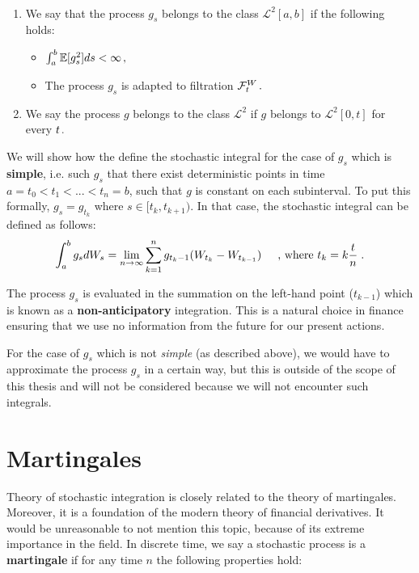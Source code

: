 \documentclass[times, utf8, diplomski]{fer}
\begin{document}
\begin{definition}~\\
\begin{enumerate}[label=(\roman*)]
	\item We say that the process $g_s$ belongs to the class $\mathcal{L}^2[a,b]$ if the following holds:
	\begin{itemize}
		\item $ \int_a^b\mathbb{E}[g_s^2]ds < \infty\hspace{0.05cm},$
		\item The process $g_s$ is adapted to filtration $\mathcal{F}_t^W\hspace{0.05cm}.$
	\end{itemize}
	\item We say the process $g$ belongs to the class $\mathcal{L}^2$ if $g$ belongs to $\mathcal{L}^2[0,t]$ for every $t\hspace{0.05cm}.$
\end{enumerate}
\end{definition}

\noindent We will show how the define the stochastic integral for the case of $g_s$ which is \textbf{simple}, i.e. such $g_s$ that there exist deterministic points in time $a=t_0 < t_1 < ... < t_n = b$, such that $g$ is constant on each subinterval. To put this formally, $g_s=g_{t_k}$ where $s \in [t_k,t_{k+1})$. In that case, the stochastic integral can be defined as follows:
$$ \int_a^bg_sdW_s = \lim_{n\rightarrow\infty} \sum_{k=1}^n g_{t_k-1}(W_{t_k} - W_{t_{k-1}}) \hspace{0.5cm} \text{, where } t_k = k\frac{t}{n}\hspace{0.1cm}.$$

\noindent The process $g_s$ is evaluated in the summation on the left-hand point ($t_{k-1}$) which is known as a \textbf{non-anticipatory} integration. This is a natural choice in finance ensuring that we use no information from the future for our present actions.

\noindent For the case of $g_s$ which is not \textit{simple} (as described above), we would have to approximate the process $g_s$ in a certain way, but this is outside of the scope of this thesis and will not be considered because we will not encounter such integrals.

\section{Martingales}
Theory of stochastic integration is closely related to the theory of martingales. Moreover, it is a foundation of the modern theory of financial derivatives. It would be unreasonable to not mention this topic, because of its extreme importance in the field. In discrete time, we say a stochastic process is a \textbf{martingale} if for any time $n$ the following properties hold: \vspace{0.5cm}
\end{document}
